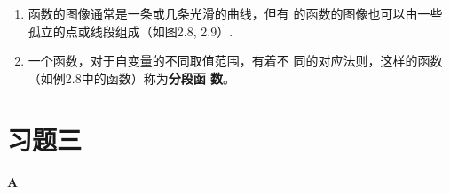 \begin{note}
\begin{enumerate}
    \item  函数的图像通常是一条或几条光滑的曲线，但有
    的函数的图像也可以由一些孤立的点或线段组成（如图2.8, 
    2.9）.
    \item 一个函数，对于自变量的不同取值范围，有着不
    同的对应法则，这样的函数（如例2.8中的函数）称为\textbf{分段函
    数}。
\end{enumerate}
\end{note}

\section*{习题三}
\begin{center}
    \bfseries A
\end{center}

